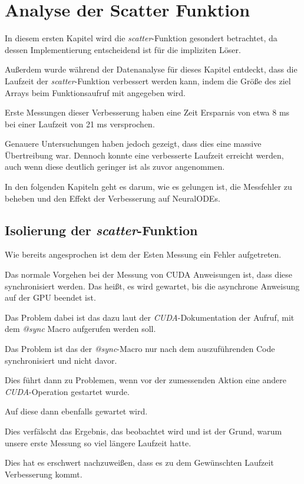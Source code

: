 
\section{Analyse der Scatter Funktion}

In diesem ersten Kapitel wird die \textit{scatter}-Funktion gesondert betrachtet, da
dessen Implementierung entscheidend ist für die impliziten Löser.

Außerdem wurde während der Datenanalyse für dieses Kapitel entdeckt,
dass die Laufzeit der \textit{scatter}-Funktion verbessert werden kann, 
indem die Größe des ziel Arrays beim Funktionsaufruf mit angegeben wird.

Erste Messungen dieser Verbesserung haben eine Zeit Ersparnis von etwa 8 ms bei einer Laufzeit von 21 ms 
versprochen.

Genauere Untersuchungen haben jedoch gezeigt, dass dies eine massive Übertreibung war.
Dennoch konnte eine verbesserte Laufzeit erreicht werden, auch wenn diese deutlich geringer ist als zuvor angenommen.

In den folgenden Kapiteln geht es darum, wie es gelungen ist, die Messfehler zu beheben und den Effekt der Verbesserung auf NeuralODEs.


\subsection{Isolierung der \textit{scatter}-Funktion}

Wie bereits angesprochen ist dem der Esten Messung ein Fehler aufgetreten.

Das normale Vorgehen bei der Messung von CUDA Anweisungen ist, 
dass diese synchronisiert werden.
Das heißt, es wird gewartet, bis die asynchrone Anweisung auf der GPU beendet ist.

Das Problem dabei ist das dazu laut der \textit{CUDA}-Dokumentation der Aufruf, mit dem \textit{@sync} Macro aufgerufen werden soll.

Das Problem ist das der \textit{@sync}-Macro nur nach dem auszuführenden Code synchronisiert und nicht davor.

Dies führt dann zu Problemen, wenn vor der zumessenden Aktion eine andere \textit{CUDA}-Operation gestartet wurde.

Auf diese dann ebenfalls gewartet wird. 

Dies verfälscht das Ergebnis, das beobachtet wird und ist der Grund, warum unsere erste Messung so viel längere Laufzeit hatte.

Dies hat es erschwert nachzuweißen, dass es zu dem Gewünschten Laufzeit Verbesserung kommt.

